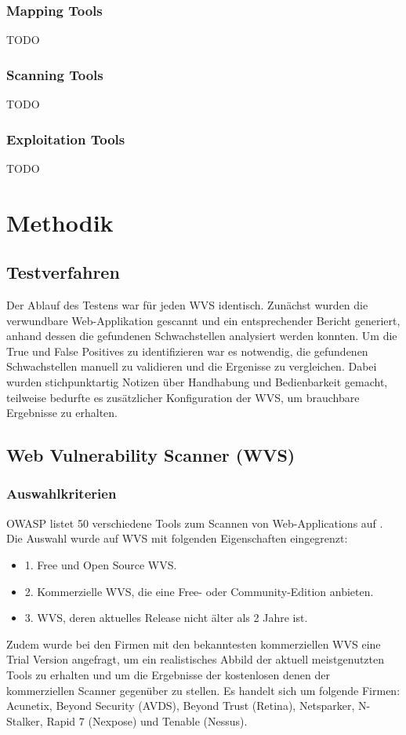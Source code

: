 \documentclass[12pt,oneside,a4paper,parskip]{scrbook}
\begin{document}
    \subsection{Mapping Tools}
    TODO
    \subsection{Scanning Tools}
    TODO
    \subsection{Exploitation Tools}
    TODO

\chapter{Methodik}
\section{Testverfahren}
Der Ablauf des Testens war für jeden WVS identisch.
Zunächst wurden die verwundbare Web-Applikation gescannt und ein entsprechender Bericht generiert, anhand dessen die gefundenen Schwachstellen analysiert werden konnten. Um die True und False Positives zu identifizieren war es notwendig, die gefundenen Schwachstellen manuell zu validieren und die Ergenisse zu vergleichen.
Dabei wurden stichpunktartig Notizen über Handhabung und Bedienbarkeit gemacht, teilweise bedurfte es zusätzlicher Konfiguration der WVS, um brauchbare Ergebnisse zu erhalten.

\section{Web Vulnerability Scanner (WVS)}
  \subsection{Auswahlkriterien}
  OWASP listet 50 verschiedene Tools zum Scannen von Web-Applications auf
  \cite{OWASPtools}. Die Auswahl wurde auf WVS mit folgenden Eigenschaften eingegrenzt:
  \begin{itemize}
    \item 1. Free und Open Source WVS.
    \item 2. Kommerzielle WVS, die eine Free- oder Community-Edition anbieten.
    \item 3. WVS, deren aktuelles Release nicht älter als 2 Jahre ist.
  \end{itemize}
  Zudem wurde bei den Firmen mit den bekanntesten kommerziellen WVS eine Trial Version angefragt, um ein realistisches Abbild der aktuell meistgenutzten Tools zu erhalten und um die Ergebnisse der kostenlosen denen der kommerziellen Scanner gegenüber zu stellen. Es handelt sich um folgende Firmen:
  \\Acunetix, Beyond Security (AVDS), Beyond Trust (Retina), Netsparker, N-Stalker, Rapid 7 (Nexpose) und Tenable (Nessus).
\end{document}
